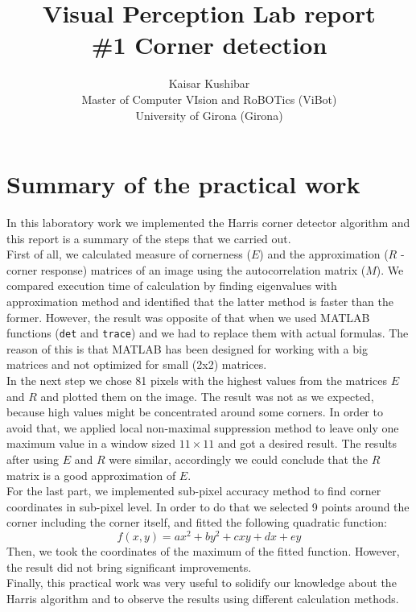 \documentclass[a4paper]{article}
\begin{document}
\title{Visual Perception Lab report \\ \#1 Corner detection}
\author{Kaisar Kushibar\\
Master of Computer VIsion and RoBOTics (ViBot)\\University of Girona (Girona)}

\maketitle

\section{Summary of the practical work}
In this laboratory work we implemented the Harris corner detector algorithm and this report is a summary of the steps that we carried out.\\

First of all, we calculated measure of cornerness ($E$) and the approximation ($R$ - corner response) matrices of an image using the autocorrelation matrix ($M$). We compared execution time of calculation by finding eigenvalues with  approximation method and identified that the latter method is faster than the former. However, the result was opposite of that when we used MATLAB functions (\texttt{det} and \texttt{trace}) and we had to replace them with actual formulas. The reason of this is that MATLAB has been designed for working with a big matrices and not optimized for small (2x2) matrices.\\

In the next step we chose 81 pixels with the highest values from the matrices $E$ and $R$ and plotted them on the image. The result was not as we expected, because high values might be concentrated around some corners. In order to avoid that, we applied local non-maximal suppression method to leave only one maximum value in a window sized $11\times 11$ and got a desired result. The results after using $E$ and $R$ were similar, accordingly we could conclude that the $R$ matrix is a good approximation of $E$.\\

For the last part, we implemented sub-pixel accuracy method to find corner coordinates in sub-pixel level. In order to do that we selected 9 points around the corner including the corner itself, and fitted the following quadratic function: 
$$
f(x,y) = ax^2+by^2+cxy+dx+ey
$$
Then, we took the coordinates of the maximum of the fitted function. However, the result did not bring significant improvements.\\

Finally, this practical work was very useful to solidify our knowledge about the Harris algorithm and to observe the results using different calculation methods.
\end{document}

